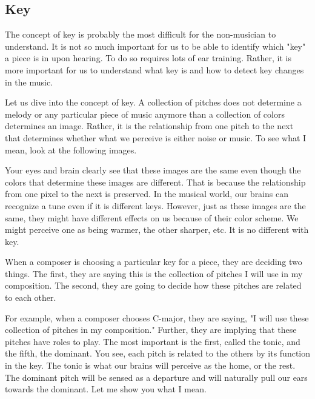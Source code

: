 

\subsection{Key}
The concept of key is probably the most difficult for the non-musician to understand. It is not so much important for us to be able to identify which "key" a piece is in upon hearing. To do so requires lots of ear training. Rather, it is more important for us to understand what key is and how to detect key changes in the music. 

Let us dive into the concept of key. A collection of pitches does not determine a melody or any particular piece of music anymore than a collection of colors determines an image. Rather, it is the relationship from one pitch to the next that determines whether what we perceive is either noise or music. To see what I mean, look at the following images.


Your eyes and brain clearly see that these images are the same even though the colors that determine these images are different. That is because the relationship from one pixel to the next is preserved. In the musical world, our brains can recognize a tune even if it is different keys. However, just as these images are the same, they might have different effects on us because of their color scheme. We might perceive one as being warmer, the other sharper, etc. It is no different with key.

When a composer is choosing a particular key for a piece, they are deciding two things. The first, they are saying this is the collection of pitches I will use in my composition. The second, they are going to decide how these pitches are related to each other. %

For example, when a composer chooses C-major, they are saying, "I will use these collection of pitches in my composition." Further, they are implying that these pitches have roles to play. The most important is the first, called the tonic, and the fifth, the dominant. You see, each pitch is related to the others by its function in the key. The tonic is what our brains will perceive as the home, or the rest. The dominant pitch will be sensed as a departure and will naturally pull our ears towards the dominant. Let me show you what I mean. 

